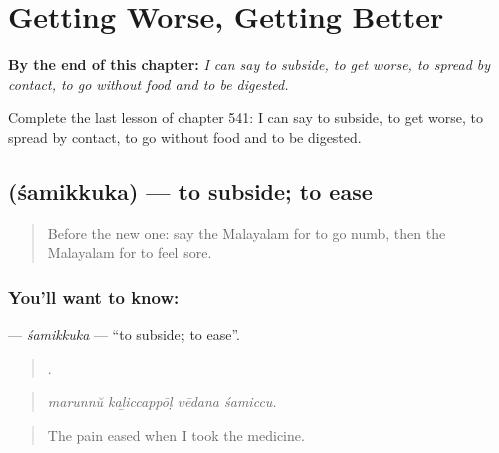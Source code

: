 
\chapter{Getting Worse, Getting Better}
\label{ch:ml-getting-worse-getting-better}

\begin{chapteropening}
\textbf{By the end of this chapter:} \emph{I can say to subside, to get worse, to spread by contact, to go without food and to be digested.}

Complete the last lesson of chapter 541: I can say to subside, to get worse, to spread by contact, to go without food and to be digested.
\end{chapteropening}

\section[\texorpdfstring{\ml{ശമിക്കുക} (śamikkuka)}{ശമിക്കുക (śamikkuka)}]{ (śamikkuka) — to subside; to ease}

\label{lesson:ML-C541-samikkuka}



\begin{quote}
Before the new one: say the Malayalam for to go numb, then the Malayalam for to feel sore.
\end{quote}

\subsection*{You'll want to know: }
\textbf{} — \emph{śamikkuka} — \textquotedblleft{}to subside; to ease\textquotedblright{}.

\begin{quote}
   .
\end{quote}

\begin{quote}
\emph{marunnŭ kaḻiccappōḷ vēdana śamiccu.}
\end{quote}

\begin{quote}
The pain eased when I took the medicine.
\end{quote}

